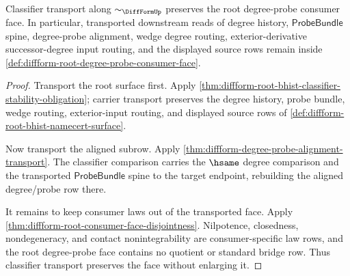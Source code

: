 \begin{theorem}
\label{thm:diffform-root-degree-probe-face-stability}
Classifier transport along $\sim_{\DiffFormUp}$ preserves the root
degree-probe consumer face. In particular, transported downstream reads of
degree history, $\mathsf{ProbeBundle}$ spine, degree-probe alignment, wedge
degree routing, exterior-derivative successor-degree input routing, and the
displayed source rows remain inside
\autoref{def:diffform-root-degree-probe-consumer-face}.
\end{theorem}
\begin{proof}
Transport the root surface first. Apply
\autoref{thm:diffform-root-bhist-classifier-stability-obligation}; carrier
transport preserves the degree history, probe bundle, wedge routing,
exterior-input routing, and displayed source rows of
\autoref{def:diffform-root-bhist-namecert-surface}.

Now transport the aligned subrow. Apply
\autoref{thm:diffform-degree-probe-alignment-transport}. The classifier
comparison carries the $\hsame$ degree comparison and the transported
$\mathsf{ProbeBundle}$ spine to the target endpoint, rebuilding the aligned
degree/probe row there.

It remains to keep consumer laws out of the transported face. Apply
\autoref{thm:diffform-root-consumer-face-disjointness}. Nilpotence, closedness,
nondegeneracy, and contact nonintegrability are consumer-specific law rows, and
the root degree-probe face contains no quotient or standard bridge row. Thus
classifier transport preserves the face without enlarging it.
\end{proof}

